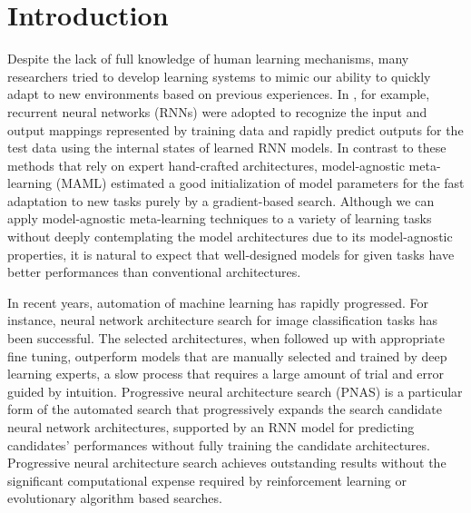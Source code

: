 \documentclass{article}
\begin{document}
\section{Introduction}
Despite the lack of full knowledge of human learning mechanisms, many researchers tried to develop learning systems to mimic our ability to quickly adapt to new environments based on previous experiences. In \cite{DBLP:journals/corr/DuanSCBSA16:fast_rl,mishra:attentive_meta:DBLP:journals/corr/MishraRCA17,santoro:memoty_meta:DBLP:conf/icml/SantoroBBWL16,DBLP:journals/corr/WangKTSLMBKB16:learn_to_rl}, for example, recurrent neural networks (RNNs) were adopted to recognize the input and output mappings represented by training data and rapidly predict outputs for the test data using the internal states of learned RNN models. In contrast to these methods that rely on expert hand-crafted architectures, model-agnostic meta-learning (MAML) \cite{finn:maml:DBLP:conf/icml/FinnAL17,nichol:reptile:DBLP:journals/corr/abs-1803-02999} estimated a good initialization of model parameters for the fast adaptation to new tasks purely by a gradient-based search. Although we can apply model-agnostic meta-learning techniques to a variety of learning tasks without deeply contemplating the model architectures due to its model-agnostic properties, it is natural to expect that well-designed models for given tasks have better performances than conventional architectures.

In recent years, automation of machine learning has rapidly progressed. For instance, neural network architecture search
for image classification tasks has been successful. The selected architectures, when followed up with appropriate fine tuning, outperform models that are manually selected and trained by deep learning experts, a slow process that requires a large amount of trial and error guided by intuition.
Progressive neural architecture  search (PNAS) \cite{liu:pnas_google:DBLP:journals/corr/abs-1712-00559} 
is a particular form of the automated search that progressively expands the search candidate neural network architectures, supported by an RNN model for predicting candidates' performances without fully training the candidate architectures. Progressive neural architecture search achieves outstanding results without the significant computational expense required by reinforcement learning or evolutionary algorithm based searches.
\end{document}
